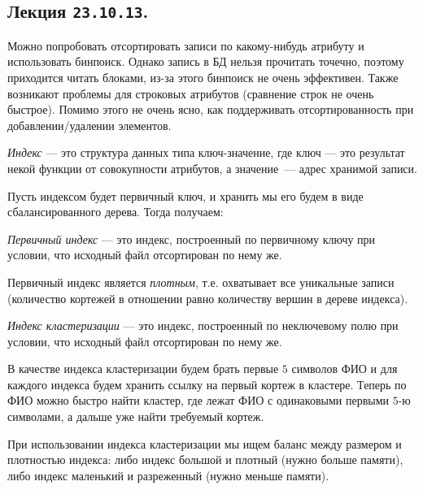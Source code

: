 \subsection{%
  Лекция \texttt{23.10.13}.%
}


Можно попробовать отсортировать записи по какому-нибудь атрибуту и использовать
бинпоиск. Однако запись в БД нельзя прочитать точечно, поэтому приходится читать
блоками, из-за этого бинпоиск не очень эффективен. Также возникают проблемы для
строковых атрибутов (сравнение строк не очень быстрое). Помимо этого не очень
ясно, как поддерживать отсортированность при добавлении/удалении элементов.

\begin{definition}
  \textit{Индекс} --- это структура данных типа ключ-значение,
  где ключ --- это результат некой функции от совокупности атрибутов, 
  а значение~--- адрес хранимой записи.
\end{definition}

Пусть индексом будет первичный ключ, и хранить мы его будем в виде
сбалансированного дерева. Тогда получаем:
\begin{definition}
  \textit{Первичный индекс} --- это индекс, построенный по первичному ключу при условии,
  что исходный файл отсортирован по нему же.
\end{definition}

Первичный индекс является \textit{плотным}, т.е. охватывает все уникальные записи
(количество кортежей в отношении равно количеству вершин в дереве индекса).

\begin{definition}
  \textit{Индекс кластеризации} --- это индекс, построенный по неключевому полю
  при условии, что исходный файл отсортирован по нему же.
\end{definition}

\begin{example}
  В качестве индекса кластеризации будем брать первые \(5\) символов ФИО и для
  каждого индекса будем хранить ссылку на первый кортеж в кластере. Теперь по
  ФИО можно быстро найти кластер, где лежат ФИО с одинаковыми первыми \(5\)-ю
  символами, а дальше уже найти требуемый кортеж.
\end{example}

\begin{remark}
  При использовании индекса кластеризации мы ищем баланс между размером и
  плотностью индекса: либо индекс большой и плотный (нужно больше памяти), либо
  индекс маленький и разреженный (нужно меньше памяти).
\end{remark}

